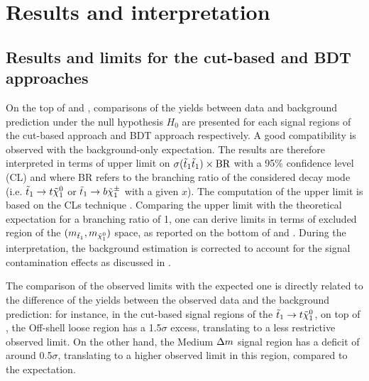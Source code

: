     \section{Results and interpretation \label{sec:analysis_results}}

    \subsection{Results and limits for the cut-based and BDT approaches}

    On the top of  and ,
    comparisons of the yields between data and background prediction under the
    null hypothesis $H_0$ are presented for each signal regions of the cut-based
    approach and BDT approach respectively.  A good compatibility is observed
    with the background-only expectation. The results are therefore interpreted
    in terms of upper limit on $\sigma(\tilde{t}_1\tilde{t}_1) \times \text{BR}$ with a
    95\% confidence level (CL) and where BR refers to the branching ratio of the
    considered decay mode (i.e. $\tilde{t}_1 \rightarrow t \tilde{\chi}_1^0$ or $\tilde{t}_1
    \rightarrow b \tilde{\chi}_1^\pm$ with a given $x$). The computation of the upper
    limit is based on the CLs technique \cite{CLs}. Comparing the upper limit
    with the theoretical expectation for a branching ratio of 1, one can derive
    limits in terms of excluded region of the $(m_{\tilde{t}_1},
    m_{\tilde{\chi}_1^0})$ space, as reported on the bottom of
     and . During the
    interpretation, the background estimation is corrected to account for the
    signal contamination effects as discussed in
    .

    The comparison of the observed limits with the expected one is directly
    related to the difference of the yields between the observed data and the
    background prediction: for instance, in the cut-based signal regions of the
    $\tilde{t}_1 \rightarrow t \tilde{\chi}_1^0$, on top of , the
    Off-shell loose region has a 1.5$\sigma$ excess, translating to a less
    restrictive observed limit. On the other hand, the Medium $\Delta m$ signal
    region has a deficit of around 0.5$\sigma$, translating to a higher observed
    limit in this region, compared to the expectation.

